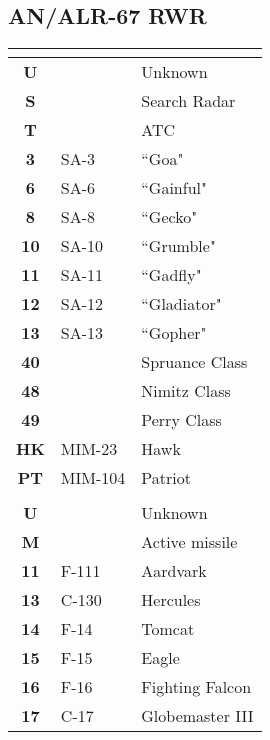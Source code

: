 \documentclass[fontHelvetica, widesubsec]{TechCheck}
\begin{document}
	\begin{multicols*}{2}
		\subsection{AN/ALR-67 RWR}
		\begin{center}
			\begin{tabular}{c | p{1.5cm}  p{2.5cm}}
				\toprule
				\multicolumn{3}{c}{\blue{SURFACE}} \\
				\midrule
				\textbf{U} & & Unknown \\
				\textbf{S} & & Search Radar \\
				\textbf{T} & & ATC\\
				\midrule
				\textbf{3} & SA-3 & ``Goa" \\
				\textbf{6} & SA-6 & ``Gainful" \\
				\textbf{8} & SA-8 & ``Gecko" \\
				\midrule
				\textbf{10} & SA-10 & ``Grumble" \\
				\textbf{11} & SA-11 & ``Gadfly" \\
				\textbf{12} & SA-12 & ``Gladiator" \\
				\textbf{13} & SA-13 & ``Gopher" \\
				\midrule
				\textbf{40} & & Spruance Class \\
				\textbf{48} & & Nimitz Class \\
				\textbf{49} & & Perry Class \\
				\midrule
				\textbf{HK} & MIM-23 & Hawk \\
				\textbf{PT} & MIM-104 & Patriot \\
				\midrule
				\multicolumn{3}{c}{\blue{AIRBORNE}} \\
				\toprule
				\textbf{U} & & Unknown \\
				\textbf{M} & & Active missile \\
				\midrule
				\textbf{11} & F-111 &  Aardvark \\
				\textbf{13} & C-130 & Hercules \\
				\midrule
				\textbf{14} & F-14 & Tomcat \\
				\textbf{15} & F-15 & Eagle \\
				\textbf{16} & F-16 & Fighting Falcon \\
				\textbf{17} & C-17 & Globemaster III \\

\end{tabular}
\end{center}
\end{multicols*}
\end{document}
